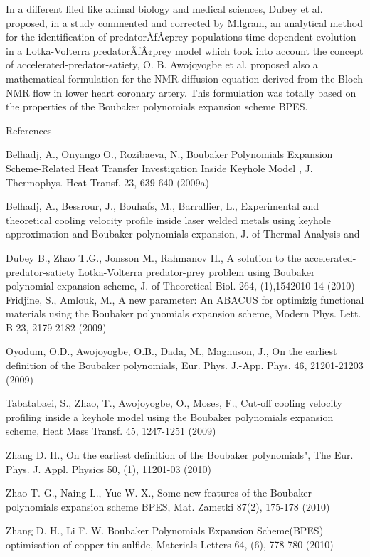 \documentclass[12pt]{article}
\begin{document}
In a different filed like animal biology and medical sciences, Dubey et al. proposed, in a study commented and corrected by Milgram, an analytical method for the identification of predatorÃƒÂ¢prey populations time-dependent evolution in a Lotka-Volterra predatorÃƒÂ¢prey model which took into account the concept of accelerated-predator-satiety, O. B. Awojoyogbe et al. proposed also a mathematical formulation for the NMR diffusion equation derived from the Bloch NMR flow in lower heart coronary artery. This formulation was totally based on the properties of the Boubaker polynomials expansion scheme BPES.


References


Belhadj, A., Onyango O., Rozibaeva, N., Boubaker Polynomials Expansion Scheme-Related Heat Transfer Investigation Inside Keyhole Model , J. Thermophys. Heat Transf. 23, 639-640 (2009a)

Belhadj, A., Bessrour, J., Bouhafs, M., Barrallier, L., Experimental and theoretical cooling velocity profile inside laser welded metals using keyhole approximation and Boubaker polynomials expansion, J. of Thermal Analysis and

Dubey B., Zhao T.G., Jonsson M., Rahmanov H., A solution to the accelerated-predator-satiety Lotka-Volterra predator-prey problem using Boubaker polynomial expansion scheme, J. of Theoretical Biol. 264, (1),1542010-14 (2010)
Fridjine, S., Amlouk, M., A new parameter: An ABACUS for optimizig functional materials using the Boubaker polynomials expansion scheme, Modern Phys. Lett. B 23, 2179-2182 (2009)

Oyodum, O.D., Awojoyogbe, O.B., Dada, M., Magnuson, J., On the earliest definition of the Boubaker polynomials, Eur. Phys. J.-App. Phys. 46, 21201-21203 (2009)

Tabatabaei, S., Zhao, T., Awojoyogbe, O., Moses, F., Cut-off cooling velocity profiling inside a keyhole model using the Boubaker polynomials expansion scheme, Heat Mass Transf. 45, 1247-1251 (2009)

Zhang D. H., On the earliest definition of the Boubaker polynomials", The Eur. Phys. J. Appl. Physics 50, (1), 11201-03 (2010)

Zhao T. G., Naing L., Yue W. X., Some new features of the Boubaker polynomials expansion scheme BPES, Mat. Zametki 87(2), 175-178 (2010)

Zhang D. H., Li F. W. Boubaker Polynomials Expansion Scheme(BPES) optimisation of copper tin sulfide, Materials Letters 64, (6), 778-780 (2010)
\end{document}
